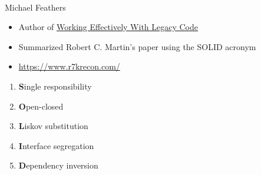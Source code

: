 \documentclass[calcdimensions,landscape,letterpaper]{powersem}
\newcommand{\thecurrentheading}{}
\newcommand{\heading}[1]{\renewcommand{\thecurrentheading}{#1}}
\begin{document}
\begin{slide}
\begin{center}
\begin{minipage}[b]{.25\textwidth}
\begin{center}
        \\
        Michael Feathers
      \end{center}
    \end{minipage}
    \begin{minipage}[b]{.7\textwidth}
      \begin{itemize}
        \item Author of \href{https://www.informit.com/store/working-effectively-with-legacy-code-9780131177055}{Working Effectively With Legacy Code}
        \item Summarized Robert C. Martin's paper using the SOLID acronym
        \item \url{https://www.r7krecon.com/}
      \end{itemize}
    \end{minipage}
  \end{center}
\end{slide}

\begin{slide}
  \heading{The SOLID Principles}
  \begin{center}
    \begin{Large}
      \begin{minipage}[c]{.6\textwidth}
        \begin{enumerate}
          \item \textbf{S}ingle responsibility
          \item \textbf{O}pen-closed
          \item \textbf{L}iskov substitution
          \item \textbf{I}nterface segregation
          \item \textbf{D}ependency inversion
        \end{enumerate}
      \end{minipage}
    \end{Large}
  \end{center}
\end{slide}
\end{document}
